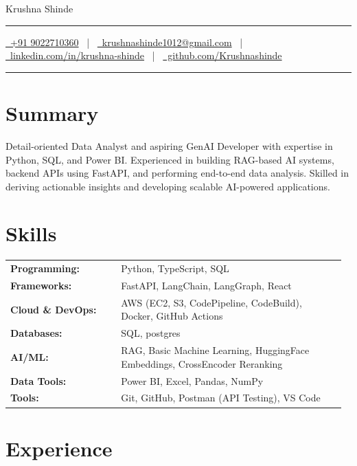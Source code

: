 \documentclass[letterpaper,10pt]{article}
\newcommand{\documentTitle}[2]{
  \begin{center}
    {\Huge\color{accentTitle} #1}\\[6pt]
    {\color{accentLine}\hrule}\vspace{2pt}
    {\footnotesize #2}\par\vspace{2pt}
    {\color{accentLine}\hrule}
  \end{center}
}
\begin{document}
\documentTitle{Krushna Shinde}{
  \href{tel:+919022710360}{\faPhone\ +91 9022710360} ~|~
  \href{mailto:krushnashinde1012@gmail.com}{\faEnvelope\ krushnashinde1012@gmail.com} ~|~
  \href{https://www.linkedin.com/in/krushna-shinde-549165276/}{\faLinkedin\ linkedin.com/in/krushna-shinde} ~|~
  \href{https://github.com/Krishna101211}{\faGithub\ github.com/Krushnashinde}
}


\section*{Summary}
Detail-oriented Data Analyst and aspiring GenAI Developer with expertise in Python, SQL, and Power BI. Experienced in building RAG-based AI systems, backend APIs using FastAPI, and performing end-to-end data analysis. Skilled in deriving actionable insights and developing scalable AI-powered applications.


\section*{Skills}
\begin{tabular}{p{0.32\linewidth} p{0.65\linewidth}}
  \textbf{Programming:} & Python, TypeScript, SQL \\
  \textbf{Frameworks:} & FastAPI, LangChain, LangGraph, React \\
  \textbf{Cloud \& DevOps:} & AWS (EC2, S3, CodePipeline, CodeBuild), Docker, GitHub Actions \\
  \textbf{Databases:} & SQL, postgres\\
  \textbf{AI/ML:} & RAG, Basic Machine Learning, HuggingFace Embeddings, CrossEncoder Reranking \\
  \textbf{Data Tools:} & Power BI, Excel, Pandas, NumPy \\
  \textbf{Tools:} & Git, GitHub, Postman (API Testing), VS Code \\
\end{tabular}


\section*{Experience}
\end{document}

